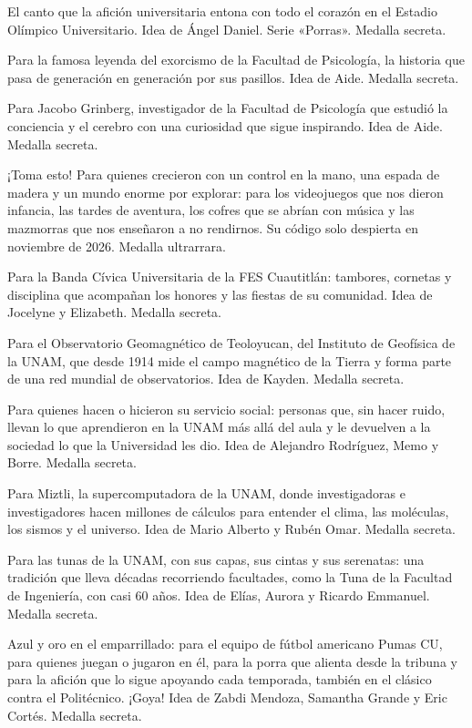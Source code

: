 \begin{description}[leftmargin=1.4cm, style=nextline]
  \item[C0M0N0T3] El canto que la afición universitaria entona con todo el corazón en el Estadio Olímpico Universitario. Idea de Ángel Daniel. Serie «Porras». Medalla secreta.
  \item[EX0RC1ST4] Para la famosa leyenda del exorcismo de la Facultad de Psicología, la historia que pasa de generación en generación por sus pasillos. Idea de Aide. Medalla secreta.
  \item[J4C0B0] Para Jacobo Grinberg, investigador de la Facultad de Psicología que estudió la conciencia y el cerebro con una curiosidad que sigue inspirando. Idea de Aide. Medalla secreta.
  \item[T0M43ST0] ¡Toma esto! Para quienes crecieron con un control en la mano, una espada de madera y un mundo enorme por explorar: para los videojuegos que nos dieron infancia, las tardes de aventura, los cofres que se abrían con música y las mazmorras que nos enseñaron a no rendirnos. Su código solo despierta en noviembre de 2026. Medalla ultrarrara.
  \item[B4NDAC1V] Para la Banda Cívica Universitaria de la FES Cuautitlán: tambores, cornetas y disciplina que acompañan los honores y las fiestas de su comunidad. Idea de Jocelyne y Elizabeth. Medalla secreta.
  \item[T30LOYUC4N] Para el Observatorio Geomagnético de Teoloyucan, del Instituto de Geofísica de la UNAM, que desde 1914 mide el campo magnético de la Tierra y forma parte de una red mundial de observatorios. Idea de Kayden. Medalla secreta.
  \item[S3RV1D0] Para quienes hacen o hicieron su servicio social: personas que, sin hacer ruido, llevan lo que aprendieron en la UNAM más allá del aula y le devuelven a la sociedad lo que la Universidad les dio. Idea de Alejandro Rodríguez, Memo y Borre. Medalla secreta.
  \item[SUP3RC0MP] Para Miztli, la supercomputadora de la UNAM, donde investigadoras e investigadores hacen millones de cálculos para entender el clima, las moléculas, los sismos y el universo. Idea de Mario Alberto y Rubén Omar. Medalla secreta.
  \item[TUN4UN4M] Para las tunas de la UNAM, con sus capas, sus cintas y sus serenatas: una tradición que lleva décadas recorriendo facultades, como la Tuna de la Facultad de Ingeniería, con casi 60 años. Idea de Elías, Aurora y Ricardo Emmanuel. Medalla secreta.
  \item[PUM4SCU] Azul y oro en el emparrillado: para el equipo de fútbol americano Pumas CU, para quienes juegan o jugaron en él, para la porra que alienta desde la tribuna y para la afición que lo sigue apoyando cada temporada, también en el clásico contra el Politécnico. ¡Goya! Idea de Zabdi Mendoza, Samantha Grande y Eric Cortés. Medalla secreta.

\end{description}
